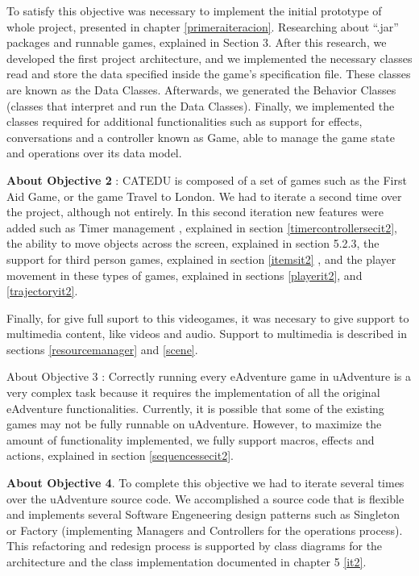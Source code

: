 To satisfy this objective was necessary to implement the initial prototype of
whole project, presented in chapter \ref{primeraiteracion}. Researching about “.jar”
packages and runnable games, explained in Section 3. After this research,
we developed the first project architecture, and we implemented the necessary classes read and store the data specified inside the game’s specification file. These classes are known as the Data Classes. Afterwards, we generated the Behavior Classes (classes that interpret and run the Data Classes). Finally, we implemented the classes required for additional functionalities such as support for effects, conversations and a controller known as Game, able to manage the game state and operations over its data model.



\textbf{About Objective 2} : CATEDU is composed of a set of games such as the First Aid Game, or the game Travel to London. We had to iterate a second time over the project, although not entirely. In this second iteration new features were added such as Timer management , explained in section \ref{timercontrollersecit2}, the ability to move objects across the screen, explained in section 5.2.3, the support for third person games, explained in section \ref{itemsit2} , and the player movement in these types of games, explained in sections \ref{playerit2}, and \ref{trajectoryit2}.

Finally, for give full suport to this videogames, it was necesary to give support to multimedia content, like videos and audio. Support to multimedia is described in sections \ref{resourcemanager} and \ref{scene}.

About Objective 3 : Correctly running every eAdventure game in uAdventure is a very complex task because it requires the implementation of all the original eAdventure functionalities. Currently, it is possible that some of the existing games may not be fully runnable on uAdventure. However, to maximize the amount of functionality implemented, we fully support macros, effects and actions, explained in section \ref{sequencessecit2}.

\textbf{About Objective 4}. To complete this objective we had to iterate several times over the uAdventure source code. We accomplished a source code that is flexible and implements several Software Engeneering design patterns such as Singleton or Factory (implementing Managers and Controllers for the operations process). This refactoring and redesign process is  supported by class diagrams for the architecture and the class implementation documented in chapter 5 \ref{it2}.

